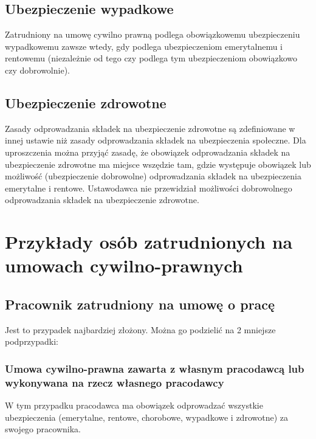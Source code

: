 \subsection[Ubezpieczenie wypadkowe][Ubezpieczenie wypadkowe]{Ubezpieczenie wypadkowe}
Zatrudniony na umowę cywilno prawną podlega obowiązkowemu ubezpieczeniu wypadkowemu zawsze wtedy, gdy podlega ubezpieczeniom emerytalnemu i rentowemu (niezależnie od tego czy podlega tym ubezpieczeniom obowiązkowo czy dobrowolnie).

\subsection[Ubezpieczenie zdrowotne][Ubezpieczenie zdrowotne]{Ubezpieczenie zdrowotne}
Zasady odprowadzania składek na ubezpieczenie zdrowotne są zdefiniowane w innej ustawie niż zasady odprowadzania składek na ubezpieczenia społeczne. Dla uproszczenia można przyjąć zasadę, że obowiązek odprowadzania składek na ubezpieczenie zdrowotne ma miejsce wszędzie tam, gdzie występuje obowiązek lub możliwość (ubezpieczenie dobrowolne) odprowadzania składek na ubezpieczenia emerytalne i rentowe. Ustawodawca nie przewidział możliwości dobrowolnego odprowadzania składek na ubezpieczenie zdrowotne.

\section[Przykłady osób zatrudnionych na umowach cywilno-prawnych][Przykłady osób zatrudnionych na umowach cywilno-prawnych]{Przykłady osób zatrudnionych na umowach cywilno-prawnych}
\label{przykladyOsob}

\subsection[Pracownik zatrudniony na umowę o pracę][Pracownik zatrudniony na umowę o pracę]{Pracownik zatrudniony na umowę o pracę}
\label{umowaOPrace}
Jest to przypadek najbardziej złożony. Można go podzielić na 2 mniejsze podprzypadki:

\subsubsection{Umowa cywilno-prawna zawarta z własnym pracodawcą lub wykonywana na rzecz własnego pracodawcy}
W tym przypadku pracodawca ma obowiązek odprowadzać wszystkie ubezpieczenia (emerytalne, rentowe, chorobowe, wypadkowe i zdrowotne) za swojego pracownika.

